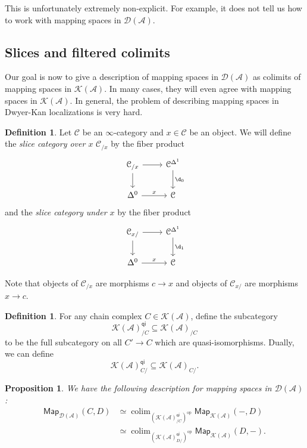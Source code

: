 \documentclass[10pt]{amsart}
\newtheorem{prop}[thm]{Proposition}
\theoremstyle{definition}
\newtheorem{defn}[thm]{Definition}
\theoremstyle{remark}
\theoremstyle{plain}
\theoremstyle{definition}
\theoremstyle{remark}
\newcommand{\mc}[1]{\mathcal{#1}}
\newcommand{\ms}[1]{\mathsf{#1}}
\newcommand{\1}{\mathbf{1}}
\newcommand{\2}{\mathbf{2}}
\newcommand{\3}{\mathbf{3}}
\DeclareMathOperator{\op}{op}
\DeclareMathOperator*{\colim}{colim}
\begin{document}
This is unfortunately extremely non-explicit. For example, it does not tell us how to work with mapping spaces in $\mc{D}(\mc{A})$.


\subsection{Slices and filtered colimits}%
\label{sub:Slices and filtered colimits}

Our goal is now to give a description of mapping spaces in $\mc{D}(\mc{A})$ as colimits of mapping spaces in $\mc{K}(\mc{A})$. In many cases, they will even agree with mapping spaces in $\mc{K}(\mc{A})$. In general, the problem of describing mapping spaces in Dwyer-Kan localizations is very hard.

\begin{defn}
    Let $\mc{C}$ be an $\infty$-category and $x \in \mc{C}$ be an object. We will define the \textit{slice category over $x$} $\mc{C}_{/x}$ by the fiber product
    \begin{equation*}
    \begin{tikzcd}
        \mc{C}_{/x} \ar{r} \ar{d} & \mc{C}^{\Delta^1} \ar{d}{\d_0} \\
        \Delta^0 \ar{r}{x} & \mc{C}
    \end{tikzcd}
    \end{equation*}
    and the \textit{slice category under $x$} by the fiber product
    \begin{equation*}
        \begin{tikzcd}
            \mc{C}_{x/} \ar{r} \ar{d} & \mc{C}^{\Delta^1} \ar{d}{\d_1} \\
            \Delta^0 \ar{r}{x} & \mc{C}
        \end{tikzcd}
    \end{equation*}
\end{defn}

Note that objects of $\mc{C}_{/x}$ are morphisms $c \to x$ and objects of $\mc{C}_{x/}$ are morphisms $x \to c$.

\begin{defn}
    For any chain complex $C \in \mc{K}(\mc{A})$, define the subcategory
    \[ \mc{K}(\mc{A})_{/C}^{\ms{qi}} \subseteq \mc{K}(\mc{A})_{/C} \]
    to be the full subcategory on all $C' \to C$ which are quasi-isomorphisms. Dually, we can define
    \[ \mc{K}(\mc{A})_{C/}^{\ms{qi}} \subseteq \mc{K}(\mc{A})_{C/}. \]
\end{defn}

\begin{prop}
    We have the following description for mapping spaces in $\mc{D}(\mc{A})$:
    \begin{align*}
        \ms{Map}_{\mc{D}(\mc{A})}(C, D) &\simeq \colim_{(\mc{K}(\mc{A})_{/C}^{\ms{qi}})^{\op}} \ms{Map}_{\mc{K}(\mc{A})}(-, D) \\
        &\simeq \colim_{(\mc{K}(\mc{A})_{D/}^{\ms{qi}})^{\op}} \ms{Map}_{\mc{K}(\mc{A})}(D, -).
    \end{align*}
\end{prop}
\end{document}

